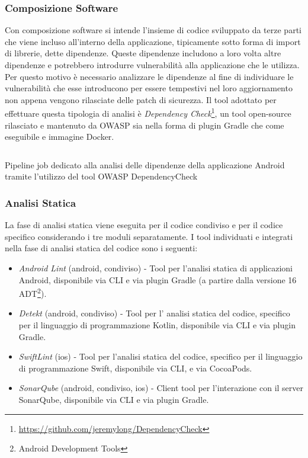 \subsubsection{Composizione Software}
Con composizione software si intende l'insieme di codice sviluppato da terze parti che viene incluso all'interno della applicazione, tipicamente sotto forma di import di librerie, dette dipendenze. Queste dipendenze includono a loro volta altre dipendenze e potrebbero introdurre vulnerabilità alla applicazione che le utilizza. \\
Per questo motivo è necessario analizzare le dipendenze al fine di individuare le vulnerabilità che esse introducono per essere tempestivi nel loro aggiornamento non appena vengono rilasciate delle patch di sicurezza. Il tool adottato per effettuare questa tipologia di analisi è \textit{Dependency Check}\footnote{\url{https://github.com/jeremylong/DependencyCheck}}, un tool open-source rilasciato e mantenuto da OWASP sia nella forma di plugin Gradle che come eseguibile e immagine Docker.

\begin{listing}[H]
\inputminted{yaml}{code/4-depcheckjob}
\caption{Pipeline job dedicato alla analisi delle dipendenze della applicazione Android tramite l'utilizzo del tool OWASP DependencyCheck}
\end{listing}

\subsubsection{Analisi Statica}
La fase di analisi statica viene eseguita per il codice condiviso e per il codice specifico considerando i tre moduli separatamente. I tool individuati e integrati nella fase di analisi statica del codice sono i seguenti:
\begin{itemize}
    \item \textit{Android Lint} (android, condiviso) - Tool per l'analisi statica di applicazioni Android, disponibile via CLI e via plugin Gradle (a partire dalla versione 16 ADT\footnote{Android Development Tools}).
    \item \textit{Detekt} (android, condiviso) - Tool per l' analisi statica del codice, specifico per il linguaggio di programmazione Kotlin, disponibile via CLI e via plugin Gradle.
    \item \textit{SwiftLint} (ios) - Tool per l'analisi statica del codice, specifico per il linguaggio di programmazione Swift, disponibile via CLI, e via CocoaPods.
    \item \textit{SonarQube} (android, condiviso, ios) - Client tool per l'interazione con il server SonarQube, disponibile via CLI e via plugin Gradle.
\end{itemize}

